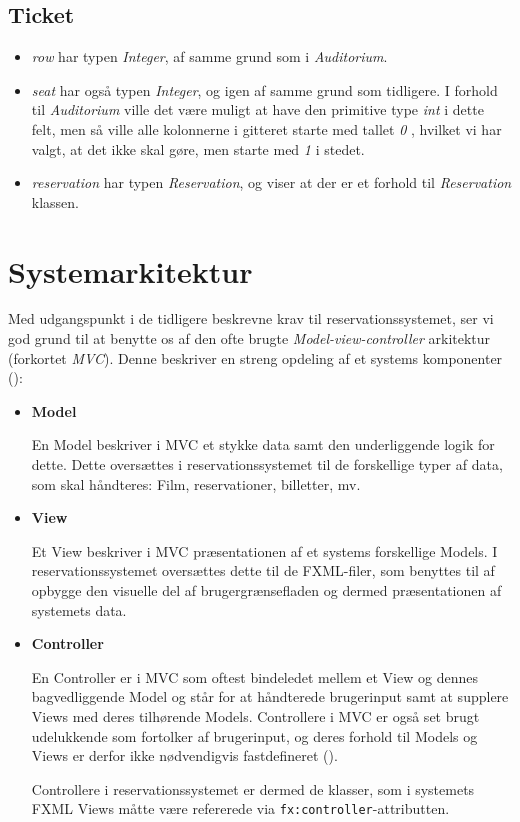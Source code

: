 \subsection{Ticket}

\begin{itemize}
  \item \textit{row} har typen \textit{Integer}, af samme grund som i \textit{Auditorium}.
  \item \textit{seat} har også typen \textit{Integer}, og igen af samme grund som tidligere. I forhold til \textit{Auditorium} ville det være muligt at have den primitive type \textit{int} i dette felt, men så ville alle kolonnerne i gitteret starte med tallet \textit{0} , hvilket vi har valgt, at det ikke skal gøre, men starte med \textit{1} i stedet.
  \item \textit{reservation} har typen \textit{Reservation}, og viser at der er et forhold til \textit{Reservation} klassen.
\end{itemize}

\section{Systemarkitektur}

Med udgangspunkt i de tidligere beskrevne krav til reservationssystemet, ser vi god grund til at benytte os af den ofte brugte \textit{Model-view-controller} arkitektur (forkortet \textit{MVC}). Denne beskriver en streng opdeling af et systems komponenter (\cite{wiki:mvc}):

\begin{itemize}
  \item
    \textbf{Model}
  
    En Model beskriver i MVC et stykke data samt den underliggende logik for dette. Dette oversættes i reservationssystemet til de forskellige typer af data, som skal håndteres: Film, reservationer, billetter, mv.
  \item
    \textbf{View}
    
    Et View beskriver i MVC præsentationen af et systems forskellige Models. I reservationssystemet oversættes dette til de FXML-filer, som benyttes til af opbygge den visuelle del af brugergrænsefladen og dermed præsentationen af systemets data.
  \item
    \textbf{Controller}
    
    En Controller er i MVC som oftest bindeledet mellem et View og dennes bagvedliggende Model og står for at håndterede brugerinput samt at supplere Views med deres tilhørende Models. Controllere i MVC er også set brugt udelukkende som fortolker af brugerinput, og deres forhold til Models og Views er derfor ikke nødvendigvis fastdefineret (\cite{burbeck1987}).
    
    Controllere i reservationssystemet er dermed de klasser, som i systemets FXML Views måtte være refererede via \texttt{fx:controller}-attributten.
\end{itemize}
